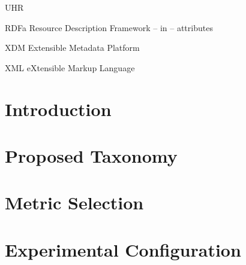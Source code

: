 \documentclass[botnum,fleqn,final]{unmeethesis}
\begin{document}
\tableofcontents
\listoffigures
\listoftables

\begin{glossary}{UHR}
   \item[RDFa] Resource Description Framework -- in -- attributes
   \item[XDM] Extensible Metadata Platform
   \item[XML] eXtensible Markup Language
\end{glossary}

\mainmatter

\chapter{Introduction}






\chapter{Proposed Taxonomy}


\chapter{Metric Selection}


\chapter{Experimental Configuration}


\pagebreak



\end{document}

